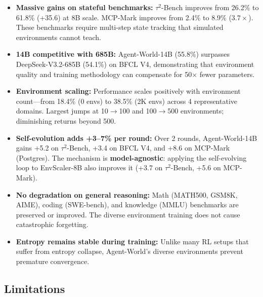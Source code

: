 \documentclass[11pt]{article}
\begin{document}
\begin{itemize}
    \item \textbf{Massive gains on stateful benchmarks:} $\tau^2$-Bench improves from 26.2\% to 61.8\% (+35.6) at 8B scale. MCP-Mark improves from 2.4\% to 8.9\% ($3.7\times$). These benchmarks require multi-step state tracking that simulated environments cannot teach.

    \item \textbf{14B competitive with 685B:} Agent-World-14B (55.8\%) surpasses DeepSeek-V3.2-685B (54.1\%) on BFCL V4, demonstrating that environment quality and training methodology can compensate for 50$\times$ fewer parameters.

    \item \textbf{Environment scaling:} Performance scales positively with environment count---from 18.4\% (0 envs) to 38.5\% (2K envs) across 4 representative domains. Largest jumps at 10$\to$100 and 100$\to$500 environments; diminishing returns beyond 500.

    \item \textbf{Self-evolution adds +3--7\% per round:} Over 2 rounds, Agent-World-14B gains +5.2 on $\tau^2$-Bench, +3.4 on BFCL V4, and +8.6 on MCP-Mark (Postgres). The mechanism is \textbf{model-agnostic}: applying the self-evolving loop to EnvScaler-8B also improves it (+3.7 on $\tau^2$-Bench, +5.6 on MCP-Mark).

    \item \textbf{No degradation on general reasoning:} Math (MATH500, GSM8K, AIME), coding (SWE-bench), and knowledge (MMLU) benchmarks are preserved or improved. The diverse environment training does not cause catastrophic forgetting.

    \item \textbf{Entropy remains stable during training:} Unlike many RL setups that suffer from entropy collapse, Agent-World's diverse environments prevent premature convergence.
\end{itemize}

\subsection{Limitations}
\end{document}
